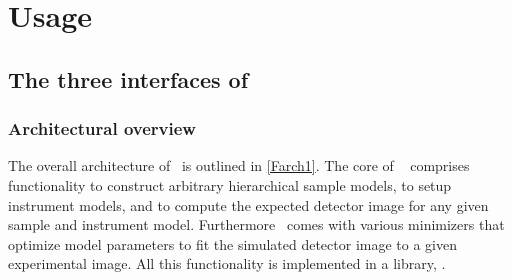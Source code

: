 
\part{Usage}\label{PUSE}

\chapter{The three interfaces of \BornAgain}  \label{sec:API3}

\section{Architectural overview}

The overall architecture of \BornAgain\ is outlined in \cref{Farch1}.
The core of \BornAgain\
comprises functionality to construct arbitrary hierarchical sample models,
to setup instrument models,
and to compute the expected detector image for any given sample and instrument model.
Furthermore \BornAgain\ comes with various minimizers that optimize model parameters
to fit the simulated detector image to a given experimental image.
All this functionality is implemented in a library, .

